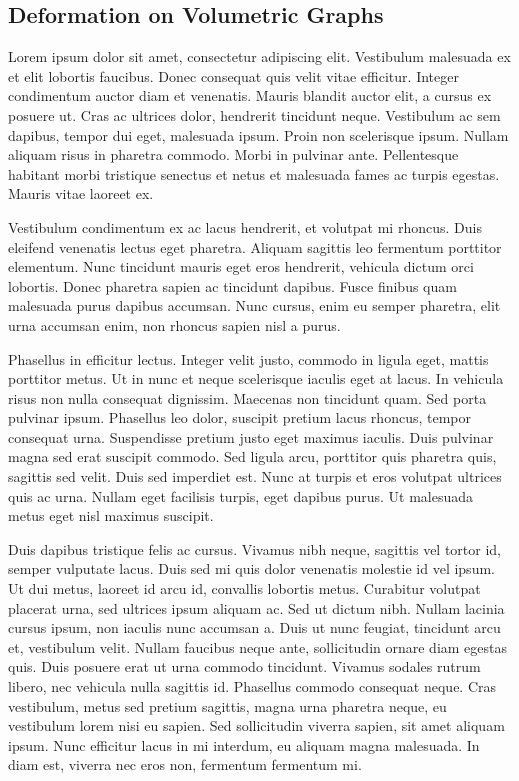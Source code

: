 \documentclass[8pt]{article}
\begin{document}
\begin{multicols}{2}
\section{Deformation on Volumetric Graphs}

Lorem ipsum dolor sit amet, consectetur adipiscing elit. Vestibulum malesuada ex et elit lobortis faucibus. Donec consequat quis velit vitae efficitur. Integer condimentum auctor diam et venenatis. Mauris blandit auctor elit, a cursus ex posuere ut. Cras ac ultrices dolor, hendrerit tincidunt neque. Vestibulum ac sem dapibus, tempor dui eget, malesuada ipsum. Proin non scelerisque ipsum. Nullam aliquam risus in pharetra commodo. Morbi in pulvinar ante. Pellentesque habitant morbi tristique senectus et netus et malesuada fames ac turpis egestas. Mauris vitae laoreet ex.

Vestibulum condimentum ex ac lacus hendrerit, et volutpat mi rhoncus. Duis eleifend venenatis lectus eget pharetra. Aliquam sagittis leo fermentum porttitor elementum. Nunc tincidunt mauris eget eros hendrerit, vehicula dictum orci lobortis. Donec pharetra sapien ac tincidunt dapibus. Fusce finibus quam malesuada purus dapibus accumsan. Nunc cursus, enim eu semper pharetra, elit urna accumsan enim, non rhoncus sapien nisl a purus.

Phasellus in efficitur lectus. Integer velit justo, commodo in ligula eget, mattis porttitor metus. Ut in nunc et neque scelerisque iaculis eget at lacus. In vehicula risus non nulla consequat dignissim. Maecenas non tincidunt quam. Sed porta pulvinar ipsum. Phasellus leo dolor, suscipit pretium lacus rhoncus, tempor consequat urna. Suspendisse pretium justo eget maximus iaculis. Duis pulvinar magna sed erat suscipit commodo. Sed ligula arcu, porttitor quis pharetra quis, sagittis sed velit. Duis sed imperdiet est. Nunc at turpis et eros volutpat ultrices quis ac urna. Nullam eget facilisis turpis, eget dapibus purus. Ut malesuada metus eget nisl maximus suscipit.

Duis dapibus tristique felis ac cursus. Vivamus nibh neque, sagittis vel tortor id, semper vulputate lacus. Duis sed mi quis dolor venenatis molestie id vel ipsum. Ut dui metus, laoreet id arcu id, convallis lobortis metus. Curabitur volutpat placerat urna, sed ultrices ipsum aliquam ac. Sed ut dictum nibh. Nullam lacinia cursus ipsum, non iaculis nunc accumsan a. Duis ut nunc feugiat, tincidunt arcu et, vestibulum velit. Nullam faucibus neque ante, sollicitudin ornare diam egestas quis. Duis posuere erat ut urna commodo tincidunt. Vivamus sodales rutrum libero, nec vehicula nulla sagittis id. Phasellus commodo consequat neque. Cras vestibulum, metus sed pretium sagittis, magna urna pharetra neque, eu vestibulum lorem nisi eu sapien. Sed sollicitudin viverra sapien, sit amet aliquam ipsum. Nunc efficitur lacus in mi interdum, eu aliquam magna malesuada. In diam est, viverra nec eros non, fermentum fermentum mi.


\end{multicols}
\end{document}

